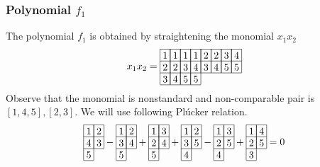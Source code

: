 \subsubsection{Polynomial \(f_1\)}
\label{sec:fv_hb40}
The polynomial \(f_1\) is obtained by straightening the monomial \(x_1x_2\)
\[
x_1x_2 = 
\begin{array}[c]{*{8}c}\cline{1-8}
\lr{1}&\lr{1}&\lr{1}&\lr{1}&\lr{2}&\lr{2}&\lr{3}&\lr{4}\\\cline{1-8}
\lr{2}&\lr{2}&\lr{3}&\lr{4}&\lr{3}&\lr{4}&\lr{5}&\lr{5}\\\cline{1-8}
\lr{3}&\lr{4}&\lr{5}&\lr{5}\\\cline{1-4}
\end{array}
\]
Observe that the monomial is nonstandard and non-comparable pair is \([1,4,5],[2,3]\). We will use following Pl\'{u}cker relation.
\[
\begin{array}[c]{*{2}c}\cline{1-2}
\lr{1}&\lr{2}\\\cline{1-2}
\lr{4}&\lr{3}\\\cline{1-2}
\lr{5}\\\cline{1-1}
\end{array}
-\begin{array}[c]{*{2}c}\cline{1-2}
\lr{1}&\lr{2}\\\cline{1-2}
\lr{3}&\lr{4}\\\cline{1-2}
\lr{5}\\\cline{1-1}
\end{array}
+\begin{array}[c]{*{2}c}\cline{1-2}
\lr{1}&\lr{3}\\\cline{1-2}
\lr{2}&\lr{4}\\\cline{1-2}
\lr{5}\\\cline{1-1}
\end{array}
+\begin{array}[c]{*{2}c}\cline{1-2}
\lr{1}&\lr{2}\\\cline{1-2}
\lr{3}&\lr{5}\\\cline{1-2}
\lr{4}\\\cline{1-1}
\end{array}
-\begin{array}[c]{*{2}c}\cline{1-2}
\lr{1}&\lr{3}\\\cline{1-2}
\lr{2}&\lr{5}\\\cline{1-2}
\lr{4}\\\cline{1-1}
\end{array}
+\begin{array}[c]{*{2}c}\cline{1-2}
\lr{1}&\lr{4}\\\cline{1-2}
\lr{2}&\lr{5}\\\cline{1-2}
\lr{3}\\\cline{1-1}
\end{array}
=0
\]
